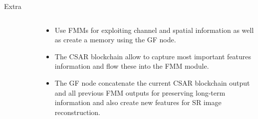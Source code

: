 \documentclass[
    xcolor={svgnames},
    hyperref={colorlinks,citecolor=OrangeRed,linkcolor=OrangeRed,urlcolor=DarkBlue}
    ]{beamer}
\begin{document}
\begin{frame}{Extra}
{\begin{columns}
\begin{column}{0.5\textwidth}
\begin{figure}
\begin{subfigure}{\textwidth}
                    \end{subfigure}            
                \end{figure}                        
            \end{column}
            \begin{column}{0.5\paperwidth}
                \begin{itemize}
                    \small
                    \item Use FMMs for exploiting channel and spatial information as well as create a memory using the GF node.
                    \item The CSAR blockchain allow to capture most important features information and flow these into the FMM module.
                    \item The GF node concatenate the current CSAR blockchain output and all previous FMM outputs for preserving long-term information and also create new features for SR image reconstruction.
                \end{itemize}
            \end{column}
        \end{columns}
    }

\end{frame}
\end{document}

